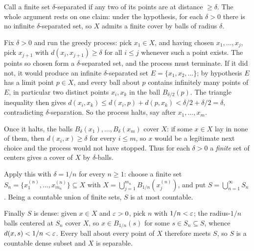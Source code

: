 \documentclass[main.tex]{subfiles}
\begin{document}
\begin{SolutionBlue}
Call a finite set $\delta$-separated if any two of its points are at distance $\ge\delta$. The whole
argument rests on one claim: under the hypothesis, for each $\delta>0$ there is no infinite
$\delta$-separated set, so $X$ admits a finite cover by balls of radius $\delta$.

Fix $\delta>0$ and run the greedy process: pick $x_1\in X$, and having chosen $x_1,\dots,x_j$, pick
$x_{j+1}$ with $d(x_i,x_{j+1})\ge\delta$ for all $i\le j$ whenever such a point exists. The points so
chosen form a $\delta$-separated set, and the process must terminate. If it did not, it would produce an
infinite $\delta$-separated set $E=\{x_1,x_2,\dots\}$; by hypothesis $E$ has a limit point $p\in X$, and
every ball about $p$ contains infinitely many points of $E$, in particular two distinct points
$x_i,x_k$ in the ball $B_{\delta/2}(p)$. The triangle inequality then gives
$d(x_i,x_k)\le d(x_i,p)+d(p,x_k)<\delta/2+\delta/2=\delta$, contradicting $\delta$-separation. So the
process halts, say after $x_1,\dots,x_m$.

Once it halts, the balls $B_\delta(x_1),\dots,B_\delta(x_m)$ cover $X$: if some $x\in X$ lay in none of
them, then $d(x_i,x)\ge\delta$ for every $i\le m$, so $x$ would be a legitimate next choice and the
process would not have stopped. Thus for each $\delta>0$ a \emph{finite} set of centers gives a cover of
$X$ by $\delta$-balls.

Apply this with $\delta=1/n$ for every $n\ge 1$: choose a finite set
$S_n=\{x^{(n)}_1,\dots,x^{(n)}_{m_n}\}\subseteq X$ with
$X=\bigcup_{j=1}^{m_n}B_{1/n}(x^{(n)}_j)$, and put $S=\bigcup_{n=1}^{\infty}S_n$. Being a countable union
of finite sets, $S$ is at most countable.

Finally $S$ is dense: given $x\in X$ and $\varepsilon>0$, pick $n$ with $1/n<\varepsilon$; the radius-$1/n$ balls
centered at $S_n$ cover $X$, so $x\in B_{1/n}(s)$ for some $s\in S_n\subseteq S$, whence
$d(x,s)<1/n<\varepsilon$. Every ball about every point of $X$ therefore meets $S$, so $S$ is a countable dense
subset and $X$ is separable.
\end{SolutionBlue}
\end{document}
